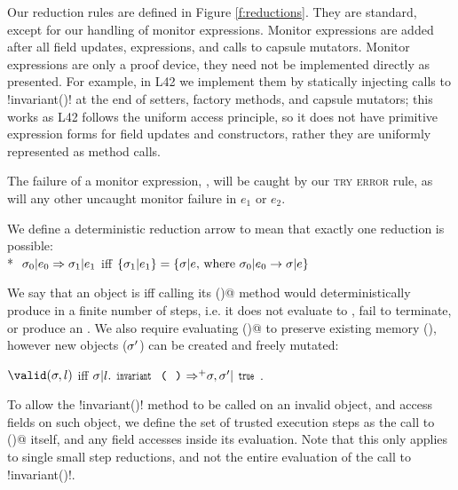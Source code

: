 Our reduction rules are defined in Figure \ref{f:reductions}.
They are standard, except for our handling of monitor expressions. Monitor expressions are added after all field updates, \Q@new@ expressions, and calls to capsule mutators.
Monitor expressions are only a proof device, they need not be implemented directly as presented.
For example, in L42 we implement them by statically injecting calls to \Q!invariant()! at the end of setters, factory methods, and capsule mutators; this works as L42 follows the uniform access principle, so it does not have primitive expression forms for field updates and constructors, rather they are uniformly represented as method calls.

The failure of a monitor expression, , will be caught by our \textsc{try error} rule, as will any other uncaught monitor failure in $e_1$ or $e_2$.

We define a deterministic reduction arrow to mean that exactly one reduction is possible:\\*
\indent$\ \sigma_0|e_0\Rightarrow \sigma_1|e_1$ iff $\{\sigma_1|e_1\}=\{\sigma|e \text{, where } \sigma_0|e_0\rightarrow \sigma|e\}$

\noindent We say that an object is \valid iff calling its \Q@invariant()@ method would
deterministically produce \Q@true@ in a finite number of steps, i.e. it does not evaluate to \Q@false@, fail to terminate, or produce an \error.
We also require evaluating \Q@invariant()@ to preserve existing memory (\s), however new objects ($\sigma'$) can be created and freely mutated:

\indent$\valid(\s,l)$ iff $\s | l.\invariant {\Rightarrow^+} \s,\s' | \Kw{true}$.%

\noindent 
To allow the \Q!invariant()! method to be called on an invalid object, and access fields on such object, we define the set of trusted execution steps as the call to \Q@invariant()@ itself, and any field accesses inside its evaluation. Note that this only applies to single small step reductions, and not the entire evaluation of the call to \Q!invariant()!.

